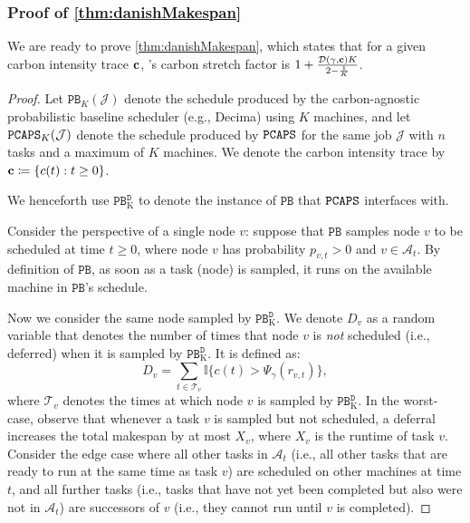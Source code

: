 \subsubsection{\textbf{Proof of \autoref{thm:danishMakespan}}}\label{apx:danishMakespan}

We are ready to prove \autoref{thm:danishMakespan}, which states that for a given carbon intensity trace ${\mathbf{c}}$, \DANISH's carbon stretch factor is $1 + \frac{\mathcal{D}(\gamma, {\mathbf{c}}) K}{2 - \frac{1}{K}}$.


\begin{proof}
Let $\texttt{PB}_K(\mathcal{J})$ denote the schedule produced by the carbon-agnostic probabilistic baseline scheduler (e.g., Decima) using $K$ machines, and let $\texttt{PCAPS}_K(\mathcal{J})$ denote the schedule produced by $\texttt{PCAPS}$ for the same job $\mathcal{J}$ with $n$ tasks and a maximum of $K$ machines. We denote the carbon intensity trace by ${\mathbf{c}} \coloneqq \{c(t) : t \ge 0\}$.

We henceforth use $\texttt{PB}_\text{K}^\texttt{D}$ to denote the instance of $\texttt{PB}$ that $\texttt{PCAPS}$ interfaces with.

Consider the perspective of a single node $v$: suppose that $\texttt{PB}$ samples node $v$ to be scheduled at time $t \geq 0$, where node $v$ has probability $p_{v,t} > 0$ and $v \in \mathcal{A}_t$.  By definition of $\texttt{PB}$, as soon as a task (node) is sampled, it runs on the available machine in $\texttt{PB}$'s schedule.

Now we consider the same node sampled by $\texttt{PB}_\text{K}^\texttt{D}$.  We denote $D_{v}$ as a random variable that denotes the number of times that node $v$ is \textit{not} scheduled (i.e., deferred) when it is sampled by $\texttt{PB}_\text{K}^\texttt{D}$. It is defined as:
\[
D_{v} = \sum_{t \in \mathcal{T}_v} \mathbb{I} \{ c(t) > \Psi_\gamma(r_{v,t}) \},
\]
where $\mathcal{T}_v$ denotes the times at which node $v$ is sampled by $\texttt{PB}_\text{K}^\texttt{D}$.
In the worst-case, observe that whenever a task $v$ is sampled but not scheduled, a deferral increases the total makespan by at most $X_v$, where $X_v$ is the runtime of task $v$.  Consider the edge case where all other tasks in $\mathcal{A}_t$ (i.e., all other tasks that are ready to run at the same time as task $v$) are scheduled on other machines at time $t$, and all further tasks (i.e., tasks that have not yet been completed but also were not in $\mathcal{A}_t$) are successors of $v$ (i.e., they cannot run until $v$ is completed).


\end{proof}
